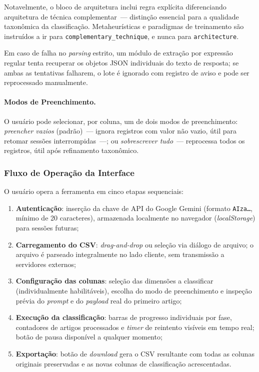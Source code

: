 Notavelmente, o bloco de arquitetura inclui regra explícita
diferenciando arquitetura de técnica complementar~--- distinção
essencial para a qualidade taxonômica da classificação. Metaheurísticas
e paradigmas de treinamento são instruídos a ir para
\texttt{complementary\_technique}, e nunca para \texttt{architecture}.

Em caso de falha no \textit{parsing} estrito, um módulo de extração
por expressão regular tenta recuperar os objetos JSON individuais do
texto de resposta; se ambas as tentativas falharem, o lote é
ignorado com registro de aviso e pode ser reprocessado manualmente.

\paragraph{Modos de Preenchimento.}

O usuário pode selecionar, por coluna, um de dois modos de
preenchimento: \textit{preencher vazios} (padrão)~--- ignora
registros com valor não vazio, útil para retomar sessões
interrompidas~---; ou \textit{sobrescrever tudo}~--- reprocessa
todos os registros, útil após refinamento taxonômico.


\subsubsection{Fluxo de Operação da Interface}

O usuário opera a ferramenta em cinco etapas sequenciais:

\begin{enumerate}
  \item \textbf{Autenticação}: inserção da chave de API do Google
        Gemini (formato \texttt{AIza\ldots}, mínimo de 20
        caracteres), armazenada localmente no navegador
        (\textit{localStorage}) para sessões futuras;
  \item \textbf{Carregamento do CSV}: \textit{drag-and-drop} ou
        seleção via diálogo de arquivo; o arquivo é parseado
        integralmente no lado cliente, sem transmissão a servidores
        externos;
  \item \textbf{Configuração das colunas}: seleção das dimensões a
        classificar (individualmente habilitáveis), escolha do modo
        de preenchimento e inspeção prévia do \textit{prompt} e do
        \textit{payload} real do primeiro artigo;
  \item \textbf{Execução da classificação}: barras de progresso
        individuais por fase, contadores de artigos processados e
        \textit{timer} de reintento visíveis em tempo real; botão de
        pausa disponível a qualquer momento;
  \item \textbf{Exportação}: botão de \textit{download} gera o CSV
        resultante com todas as colunas originais preservadas e as
        novas colunas de classificação acrescentadas.
\end{enumerate}


